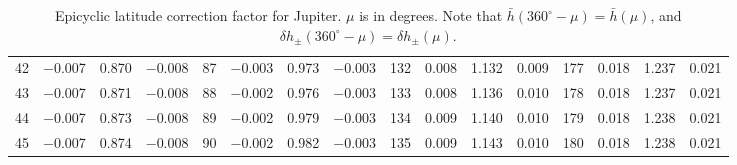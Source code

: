 \begin{table}[!h]
{\begin{tabular}{rrrr|rrrr|rrrr|crrr}
 42 & \tiny{ $-$0.007} &   0.870 & \tiny{ $-$0.008} &  87 & \tiny{ $-$0.003} &   0.973 & \tiny{ $-$0.003} & 132 & \tiny{  0.008} &   1.132 & \tiny{  0.009} & 177 & \tiny{  0.018} &   1.237 & \tiny{  0.021}\\
 43 & \tiny{ $-$0.007} &   0.871 & \tiny{ $-$0.008} &  88 & \tiny{ $-$0.002} &   0.976 & \tiny{ $-$0.003} & 133 & \tiny{  0.008} &   1.136 & \tiny{  0.010} & 178 & \tiny{  0.018} &   1.237 & \tiny{  0.021}\\
 44 & \tiny{ $-$0.007} &   0.873 & \tiny{ $-$0.008} &  89 & \tiny{ $-$0.002} &   0.979 & \tiny{ $-$0.003} & 134 & \tiny{  0.009} &   1.140 & \tiny{  0.010} & 179 & \tiny{  0.018} &   1.238 & \tiny{  0.021}\\
 45 & \tiny{ $-$0.007} &   0.874 & \tiny{ $-$0.008} &  90 & \tiny{ $-$0.002} &   0.982 & \tiny{ $-$0.003} & 135 & \tiny{  0.009} &   1.143 & \tiny{  0.010} & 180 & \tiny{  0.018} &   1.238 & \tiny{  0.021}\\
 \end{tabular}}
\caption{Epicyclic latitude correction factor for Jupiter. $\mu$ is in degrees. Note that $\bar{h}(360^\circ-\mu) = \bar{h}(\mu)$, and $\delta h_{\pm}(360^\circ-\mu) = \delta h_{\pm}(\mu)$. }\label{tlat2j}
\end{table}

